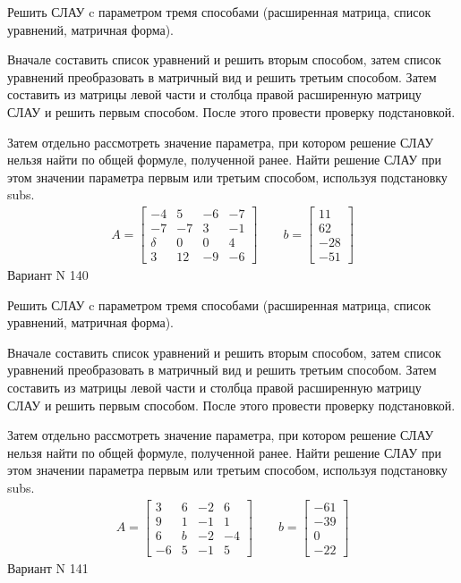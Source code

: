 \documentclass[11pt]{report}
\begin{document}
Решить СЛАУ c параметром тремя способами (расширенная матрица, список уравнений, матричная форма).

Вначале составить список уравнений и решить вторым способом,
затем список уравнений преобразовать в матричный вид и решить третьим способом.
Затем составить из матрицы левой части и столбца правой расширенную матрицу СЛАУ и решить первым способом.
После этого провести проверку подстановкой.

Затем отдельно рассмотреть значение параметра, при котором решение СЛАУ нельзя найти по общей формуле,
полученной ранее.
Найти решение СЛАУ при этом значении параметра первым или третьим способом, используя подстановку subs.
\begin{align*}
    A = \left[\begin{matrix}-4 & 5 & -6 & -7\\-7 & -7 & 3 & -1\\\delta & 0 & 0 & 4\\3 & 12 & -9 & -6\end{matrix}\right]
\qquad b = \left[\begin{matrix}11\\62\\-28\\-51\end{matrix}\right]
\end{align*}
\newpage
Вариант N 140


Решить СЛАУ c параметром тремя способами (расширенная матрица, список уравнений, матричная форма).

Вначале составить список уравнений и решить вторым способом,
затем список уравнений преобразовать в матричный вид и решить третьим способом.
Затем составить из матрицы левой части и столбца правой расширенную матрицу СЛАУ и решить первым способом.
После этого провести проверку подстановкой.

Затем отдельно рассмотреть значение параметра, при котором решение СЛАУ нельзя найти по общей формуле,
полученной ранее.
Найти решение СЛАУ при этом значении параметра первым или третьим способом, используя подстановку subs.
\begin{align*}
    A = \left[\begin{matrix}3 & 6 & -2 & 6\\9 & 1 & -1 & 1\\6 & b & -2 & -4\\-6 & 5 & -1 & 5\end{matrix}\right]
\qquad b = \left[\begin{matrix}-61\\-39\\0\\-22\end{matrix}\right]
\end{align*}
\newpage
Вариант N 141
\end{document}
